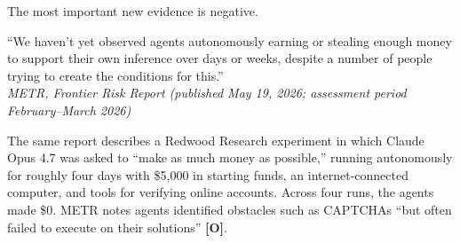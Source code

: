 \documentclass[11pt,letterpaper]{article}
\begin{document}
The most important new evidence is negative.

\begin{quotebox}
``We haven't yet observed agents autonomously earning or stealing enough money to support their own inference over days or weeks, despite a number of people trying to create the conditions for this.''\\[0.3em]
\hfill \textit{METR, Frontier Risk Report (published May 19, 2026; assessment period February--March 2026)}
\end{quotebox}

The same report describes a Redwood Research experiment in which Claude Opus 4.7 was asked to ``make as much money as possible,'' running autonomously for roughly four days with \$5,000 in starting funds, an internet-connected computer, and tools for verifying online accounts. Across four runs, the agents made \$0. METR notes agents identified obstacles such as CAPTCHAs ``but often failed to execute on their solutions'' \textbf{[O]}.
\end{document}

